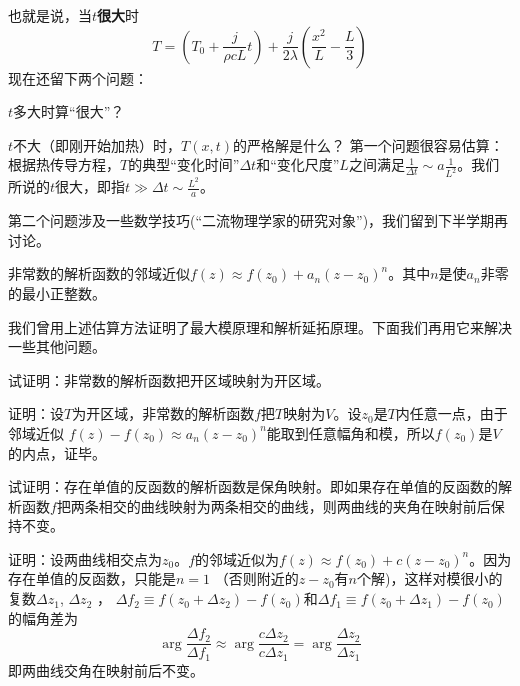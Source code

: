 \documentclass[CJK]{beamer}
\begin{document}
\begin{frame}
  \bch
  也就是说，当$t${\bf 很大}时
  $$ T = \left(T_0+\frac{j}{\rho cL} t\right) + \frac{j}{2\lambda} \left(\frac{x^2}{L} - \frac{L}{3}\right)  $$
  现在还留下两个问题：
  \bitem
\item{$t$多大时算“很大”？}
\item{$t$不大（即刚开始加热）时，$T(x,t)$的严格解是什么？}
  \eitem
 第一个问题很容易估算：根据热传导方程，$T$的典型“变化时间”$\Delta t$和“变化尺度”$L$之间满足$ \frac{1}{\Delta t} \sim a\frac{1}{L^2} $。我们所说的$t$很大，即指$t\gg \Delta t \sim \frac{L^2}{a}$。

  第二个问题涉及一些数学技巧(“二流物理学家的研究对象”\huaixiao)，我们留到下半学期再讨论。
  \ech
\end{frame}


\begin{frame}
  \bch
      {\blue  非常数的解析函数的邻域近似$f(z) \approx f(z_0) + a_n(z-z_0)^n$。}其中$n$是使$a_n$非零的最小正整数。

      \skiplines
      
      我们曾用上述估算方法证明了最大模原理和解析延拓原理。下面我们再用它来解决一些其他问题。
  \ech
\end{frame}

\begin{frame}
  \chtitle{\proid (\stwo)}
  \bch
  试证明：{\blue  非常数的解析函数把开区域映射为开区域。}

  \ech
\end{frame}


\begin{frame}
  \bch
  证明：设$T$为开区域，非常数的解析函数$f$把$T$映射为$V$。设$z_0$是$T$内任意一点，由于邻域近似
  $f(z) - f(z_0)  \approx  a_n (z-z_0)^n$能取到任意幅角和模，所以$f(z_0)$是$V$的内点，证毕。
  \ech
\end{frame}

\begin{frame}
  \chtitle{\proid (\stwo)}
  \bch
  试证明：{\blue  存在单值的反函数的解析函数是保角映射。}即如果存在单值的反函数的解析函数$f$把两条相交的曲线映射为两条相交的曲线，则两曲线的夹角在映射前后保持不变。
  \ech
\end{frame}

\begin{frame}
  \bch
  证明：设两曲线相交点为$z_0$。$f$的邻域近似为$f(z) \approx f(z_0) + c(z-z_0)^n$。因为存在单值的反函数，只能是$n=1$ （否则附近的$z-z_0$有$n$个解)，这样对模很小的复数$\Delta z_1$, $\Delta z_2$ ， $\Delta f_2 \equiv f(z_0+\Delta z_2) - f(z_0)$和$\Delta f_1 \equiv f(z_0+\Delta z_1) -f(z_0)$的幅角差为
    $$ \arg \frac{\Delta f_2}{\Delta f_1} \approx \arg\frac{c\Delta z_2}{c\Delta z_1} = \arg \frac{\Delta z_2}{\Delta z_1} $$
  即两曲线交角在映射前后不变。

    

  \ech
\end{frame}
\end{document}
